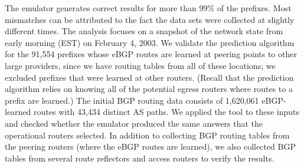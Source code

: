 The emulator generates correct results for more than $99\%$ of the 
prefixes. Most mismatches can be attributed to the fact
the data sets were collected at slightly different times.
The analysis focuses on a snapshot of the network state from early
morning (EST) on February 4, 2003.  We validate the prediction algorithm
for the 91,554
prefixes whose eBGP routes are
learned at peering points to other large providers, since we have routing
tables from all of these locations; we
excluded prefixes that were learned at other routers.
(Recall that the prediction algorithm relies
on knowing all of the potential egress routers where routes to a prefix
are learned.)
The initial BGP routing data consists of 1,620,061 eBGP-learned routes
with 43,434 distinct AS paths.  We applied the tool
to these inputs and checked whether the emulator produced the same
answers that the operational routers selected.  In addition to
collecting BGP routing tables from the peering routers (where the eBGP
routes are learned), we also collected BGP tables from several 
route reflectors and access routers to verify the results.

